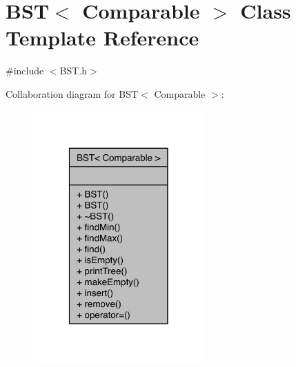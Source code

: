 \hypertarget{class_b_s_t}{\section{B\-S\-T$<$ Comparable $>$ Class Template Reference}
\label{class_b_s_t}
}


{\ttfamily \#include $<$B\-S\-T.\-h$>$}



Collaboration diagram for B\-S\-T$<$ Comparable $>$\-:
\nopagebreak
\begin{figure}[H]
\begin{center}
\leavevmode
\includegraphics[width=186pt]{class_b_s_t__coll__graph}
\end{center}
\end{figure}

